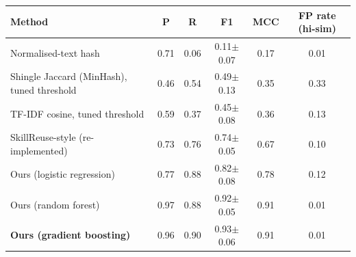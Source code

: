 \begin{tabular}{lccccc}
\toprule
Method & P & R & F1 & MCC & FP rate (hi-sim) \\
\midrule
Normalised-text hash & 0.71 & 0.06 & 0.11$\pm$0.07 & 0.17 & 0.01 \\
Shingle Jaccard (MinHash), tuned threshold & 0.46 & 0.54 & 0.49$\pm$0.13 & 0.35 & 0.33 \\
TF-IDF cosine, tuned threshold & 0.59 & 0.37 & 0.45$\pm$0.08 & 0.36 & 0.13 \\
SkillReuse-style (re-implemented) & 0.73 & 0.76 & 0.74$\pm$0.05 & 0.67 & 0.10 \\
\midrule
Ours (logistic regression) & 0.77 & 0.88 & 0.82$\pm$0.08 & 0.78 & 0.12 \\
Ours (random forest) & 0.97 & 0.88 & 0.92$\pm$0.05 & 0.91 & 0.01 \\
\textbf{Ours (gradient boosting)} & 0.96 & 0.90 & 0.93$\pm$0.06 & 0.91 & 0.01 \\
\bottomrule
\end{tabular}
